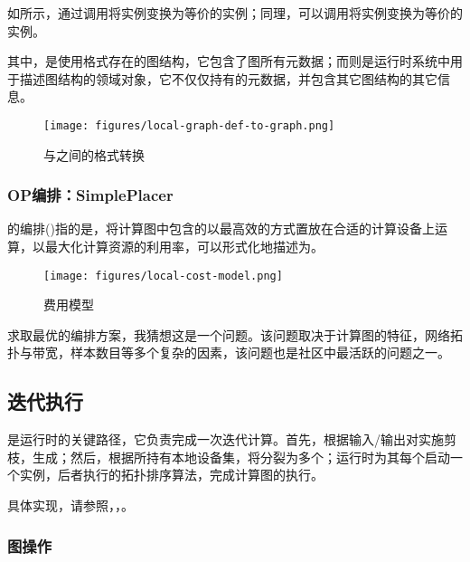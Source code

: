 \begin{content}
如所示，通过调用将实例变换为等价的实例；同理，可以调用将实例变换为等价的实例。

其中，是使用格式存在的图结构，它包含了图所有元数据；而则是运行时系统中用于描述图结构的领域对象，它不仅仅持有的元数据，并包含其它图结构的其它信息。

\begin{figure}[H]
\centering
\texttt{[image: figures/local-graph-def-to-graph.png]}
\caption{与之间的格式转换}
 \label{fig:local-graph-def-to-graph}
\end{figure}

\subsubsection{OP编排：SimplePlacer}

的编排()指的是，将计算图中包含的以最高效的方式置放在合适的计算设备上运算，以最大化计算资源的利用率，可以形式化地描述为。

\begin{figure}[H]
\centering
\texttt{[image: figures/local-cost-model.png]}
\caption{费用模型}
 \label{fig:local-cost-model}
\end{figure}

求取最优的编排方案，我猜想这是一个问题。该问题取决于计算图的特征，网络拓扑与带宽，样本数目等多个复杂的因素，该问题也是社区中最活跃的问题之一。

\subsection{迭代执行}

是\tf{}运行时的关键路径，它负责完成一次迭代计算。首先，根据输入/输出对实施剪枝，生成；然后，根据所持有本地设备集，将分裂为多个；运行时为其每个启动一个实例，后者执行的拓扑排序算法，完成计算图的执行。

具体实现，请参照，，。

\subsubsection{图操作}


\end{content}
